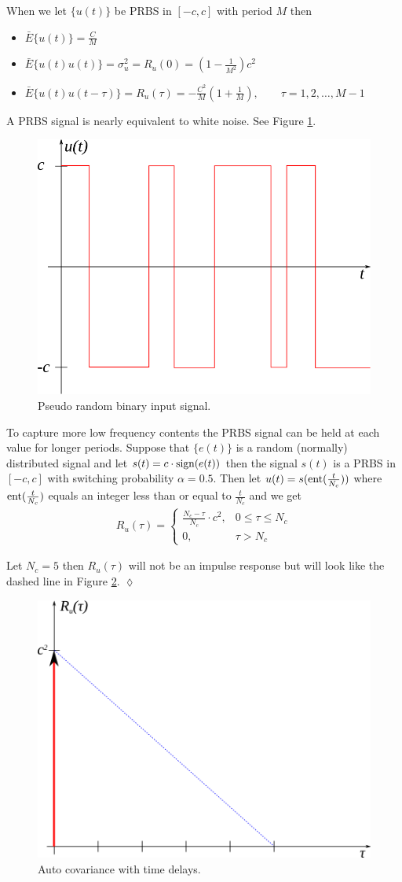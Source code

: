 When we let $\{u(t)\}$ be PRBS in $[-c,c]$ with period $M$ then
\begin{itemize}
\item $\bar{E}\{u(t)\} = \frac{C}{M}$
\item $\bar{E}\{u(t)u(t)\} = \sigma_u^2 = R_u(0) = (1-\frac{1}{M^2})c^2$
\item $\bar{E}\{u(t)u(t-\tau)\} = R_u(\tau) = -\frac{C^2}{M}(1+\frac{1}{M}), \qquad \tau=1,2,\ldots,M-1$
\end{itemize}
A PRBS signal is nearly equivalent to white noise. See Figure \ref{fig:19prbs}.

\begin{figure}[ht!]
	\centering
	\includegraphics[width=.4\textwidth]{images/19prbs}
	\caption{Pseudo random binary input signal.}
	\label{fig:19prbs}
\end{figure}

To capture more low frequency contents the PRBS signal can be held at each value for longer periods. Suppose that $\{e(t)\}$ is a random (normally) distributed signal and let $s(t)=c\cdot\mathop{\text{sign}}\limits(e(t))$ then the signal $s(t)$ is a PRBS in $[-c,c]$ with switching probability $\alpha=0.5$. Then let $u(t)=s(\mathop{\text{ent}}\limits(\frac{t}{N_c}))$ where $\mathop{\text{ent}}\limits(\frac{t}{N_c})$ equals an integer less than or equal to $\frac{t}{N_c}$ and we get
\begin{align}
\label{eq:19ru}
R_u(\tau) = \begin{cases} \frac{N_c-\tau}{N_c}\cdot c^2, & 0\leq\tau\leq N_c \\ 0, & \tau>N_c \end{cases}
\end{align}

\begin{example}
Let $N_c=5$ then $R_u(\tau)$ will not be an impulse response but will look like the dashed line in Figure \ref{fig:19nc}.
$\lozenge$
\end{example}

\begin{figure}[ht!]
	\centering
	\includegraphics[width=.4\textwidth]{images/19nc}
	\caption{Auto covariance with time delays.}
	\label{fig:19nc}
\end{figure}

